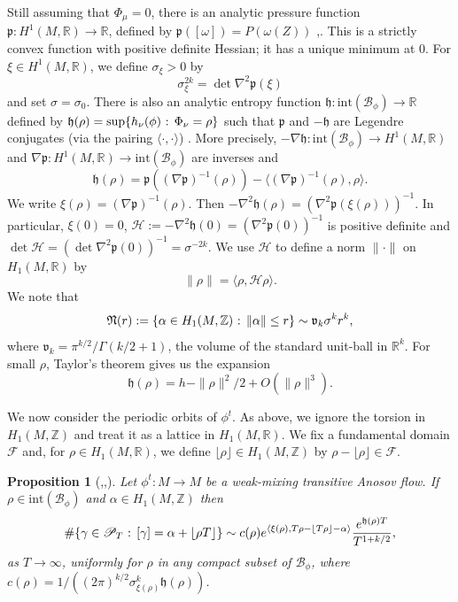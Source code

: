 \documentclass[11pt]{amsart}
\newtheorem{proposition}[theorem]{Proposition}%
\theoremstyle{definition}
\numberwithin{equation}{section}
\numberwithin{theorem}{section}
\def\Z{\mathbb{Z}}
\def\R{\mathbb{R}}
\begin{document}
Still assuming that $\Phi_\mu=0$, there is an analytic pressure function
$\mathfrak p : H^1(M,\R) \to \R$, defined by
$
\mathfrak p([\omega]) = P(\omega(Z))$ \cite{Katsuda-Sunada90},\cite{Sharp93}. This is a strictly convex function with
positive definite Hessian; it has a unique minimum at $0$.
For $\xi \in H^1(M,\R)$, we define
$\sigma_\xi >0$ by 
\[
\sigma_\xi^{2k} = \det \nabla^2 \mathfrak p(\xi)
\]
and set $\sigma=\sigma_0$.
There is also an analytic entropy function
$\mathfrak h : \mathrm{int}(\mathscr B_\phi) \to \R$ defined by
$
\mathfrak h(\rho) = \sup\{h_\nu(\phi) \hbox{ : } \Phi_\nu =\rho\}$
such that $\mathfrak p$ and $-\mathfrak h$ are Legendre conjugates 
(via the pairing $\langle \cdot,\cdot \rangle$) \cite{Rock}.
More precisely,
$-\nabla \mathfrak h :  \mathrm{int}(\mathscr B_\phi) \to H^1(M,\R)$
and $\nabla \mathfrak p : H^1(M,\R) \to \mathrm{int}(\mathscr B_\phi)$ are inverses
and
\[
\mathfrak h(\rho) = \mathfrak p((\nabla \mathfrak p)^{-1}(\rho)) - \langle (\nabla \mathfrak p)^{-1}(\rho),\rho \rangle.
\]
We write $\xi(\rho) = (\nabla \mathfrak p)^{-1}(\rho)$.
Then
$-\nabla^2 \mathfrak h(\rho) = (\nabla^2 \mathfrak p(\xi(\rho)))^{-1}$.
In particular, $\xi(0)=0$, 
$\mathcal H := -\nabla^2 \mathfrak h(0) = (\nabla^2 \mathfrak p(0))^{-1}$
is positive definite
and 
$\det \mathcal H = (\det \nabla^2 \mathfrak p(0))^{-1}
= \sigma^{-2k}$. 
We use $\mathcal H$ to define a norm $\|\cdot\|$ on $H_1(M,\R)$ by
\[
\|\rho\| = \langle \rho, \mathcal H\rho \rangle.
\]
We note that
\[
\mathfrak N(r) := \{\alpha \in H_1(M,\Z) \hbox{ : } \|\alpha\| \le r\}
\sim \mathfrak v_k \sigma^k r^k,
\]
where $\mathfrak v_k = \pi^{k/2}/\Gamma(k/2+1)$, the volume of the standard unit-ball in $\R^k$.
For small $\rho$, Taylor's theorem gives us the expansion
\begin{equation}\label{eq:taylor}
\mathfrak h(\rho) = h - \|\rho\|^2/2 + O(\|\rho\|^3).
\end{equation}


We now consider the periodic orbits of $\phi^t$. As above, we ignore the torsion in $H_1(M,\Z)$
and treat it as a lattice in $H_1(M,\R)$. We fix a fundamental domain $\mathscr F$ and,
for $\rho \in H_1(M,\R)$, we define $\lfloor \rho \rfloor \in H_1(M,\Z)$ by
$\rho-\lfloor \rho \rfloor \in \mathscr F$.

\begin{proposition}[\cite{bab-led},\cite{lalley},\cite{Sharp93}]\label{prop:uniform_asymptotic}
 Let $\phi^t : M \to M$ be a weak-mixing transitive Anosov flow. If
 $\rho \in \mathrm{int}(\mathscr B_\phi)$ and $\alpha \in H_1(M,\Z)$ then
 \[
 \#\{\gamma \in \mathscr P_T \hbox{ : } [\gamma] = \alpha + \lfloor \rho T \rfloor\}
 \sim
c(\rho)
 e^{\langle \xi(\rho),T\rho - \lfloor T\rho \rfloor -\alpha\rangle}
 \frac{e^{\mathfrak h(\rho)T}}{T^{1+k/2}},
 \]
 as $T \to \infty$,
 uniformly for $\rho$ in any compact subset of $\mathscr B_\phi$,
 where $c(\rho) =1/( (2\pi)^{k/2} \sigma^k_{\xi(\rho)} \mathfrak h(\rho))$.
\end{proposition}
\end{document}
